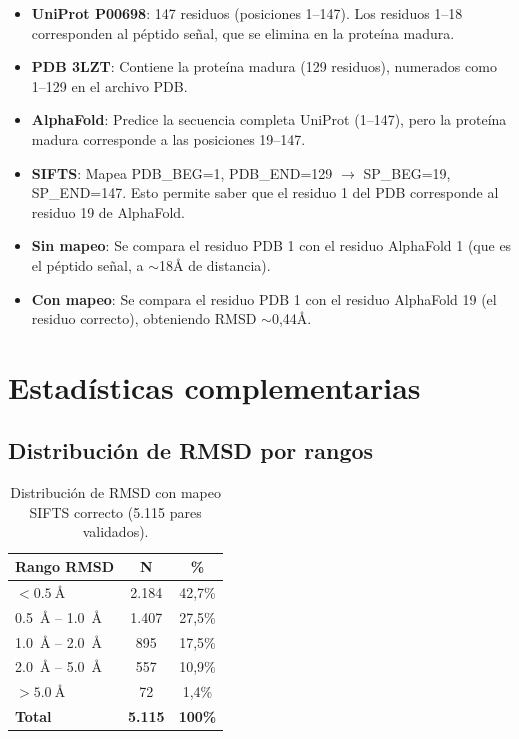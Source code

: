 \begin{itemize}
    \item \textbf{UniProt P00698}: 147 residuos (posiciones 1--147). Los residuos 1--18
    corresponden al p\'eptido se\~nal, que se elimina en la prote\'ina madura.

    \item \textbf{PDB 3LZT}: Contiene la prote\'ina madura (129 residuos), numerados
    como 1--129 en el archivo PDB.

    \item \textbf{AlphaFold}: Predice la secuencia completa UniProt (1--147), pero la
    prote\'ina madura corresponde a las posiciones 19--147.

    \item \textbf{SIFTS}: Mapea PDB\_BEG=1, PDB\_END=129 $\rightarrow$ SP\_BEG=19,
    SP\_END=147. Esto permite saber que el residuo 1 del PDB corresponde al residuo
    19 de AlphaFold.

    \item \textbf{Sin mapeo}: Se compara el residuo PDB 1 con el residuo AlphaFold 1
    (que es el p\'eptido se\~nal, a $\sim$18\AA{} de distancia).

    \item \textbf{Con mapeo}: Se compara el residuo PDB 1 con el residuo AlphaFold 19
    (el residuo correcto), obteniendo RMSD $\sim$0,44\AA.
\end{itemize}


\section{Estad\'isticas complementarias}
\label{appendix:stats}

\subsection{Distribuci\'on de RMSD por rangos}

\begin{table}[H]
\centering
\caption{Distribuci\'on de RMSD con mapeo SIFTS correcto (5.115 pares validados).}
\label{tab:rmsd_distribution}
\begin{tabular}{@{}lcc@{}}
\toprule
\textbf{Rango RMSD} & \textbf{N} & \textbf{\%} \\
\midrule
$< \SI{0,5}{\angstrom}$ & 2.184 & 42,7\% \\
\SI{0,5}{\angstrom} -- \SI{1,0}{\angstrom} & 1.407 & 27,5\% \\
\SI{1,0}{\angstrom} -- \SI{2,0}{\angstrom} & 895 & 17,5\% \\
\SI{2,0}{\angstrom} -- \SI{5,0}{\angstrom} & 557 & 10,9\% \\
$> \SI{5,0}{\angstrom}$ & 72 & 1,4\% \\
\midrule
\textbf{Total} & \textbf{5.115} & \textbf{100\%} \\
\bottomrule
\end{tabular}
\end{table}

